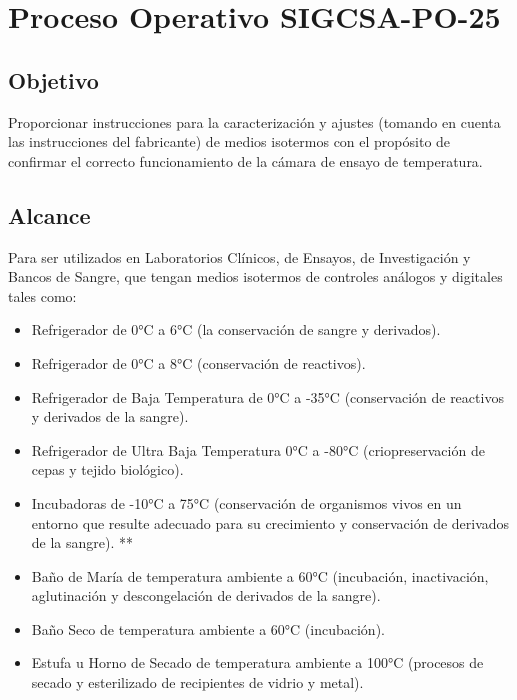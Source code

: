 \section{Proceso Operativo SIGCSA-PO-25}
	\subsection{Objetivo}
		\par 
			Proporcionar instrucciones para la caracterización y ajustes (tomando en cuenta las instrucciones
			del fabricante) de medios isotermos con el propósito de confirmar el correcto funcionamiento de
			la cámara de ensayo de temperatura.
	\subsection{Alcance}
		\par 
			Para ser utilizados en Laboratorios Clínicos, de Ensayos, de Investigación y Bancos de Sangre, que
			tengan medios isotermos de controles análogos y digitales tales como:
		
		\begin{itemize}
			\item Refrigerador de 0°C a 6°C (la conservación de sangre y derivados).
			
			\item Refrigerador de 0°C a 8°C (conservación de reactivos).
			
			\item Refrigerador de Baja Temperatura de 0°C a -35°C (conservación de reactivos y derivados
			de la sangre).
			
			\item Refrigerador de Ultra Baja Temperatura 0°C a -80°C (criopreservación de cepas y tejido
			biológico).
			
\clearpage
\thispagestyle{plain}
			
			\item Incubadoras de -10°C a 75°C (conservación de organismos vivos en un entorno que
			resulte adecuado para su crecimiento y conservación de derivados de la sangre). **
			
			\item Baño de María de temperatura ambiente a 60°C (incubación, inactivación, aglutinación y
			descongelación de derivados de la sangre).
			
			\item Baño Seco de temperatura ambiente a 60°C (incubación).
			
			\item Estufa u Horno de Secado de temperatura ambiente a 100°C (procesos de secado y
			esterilizado de recipientes de vidrio y metal).
		\end{itemize}
	
